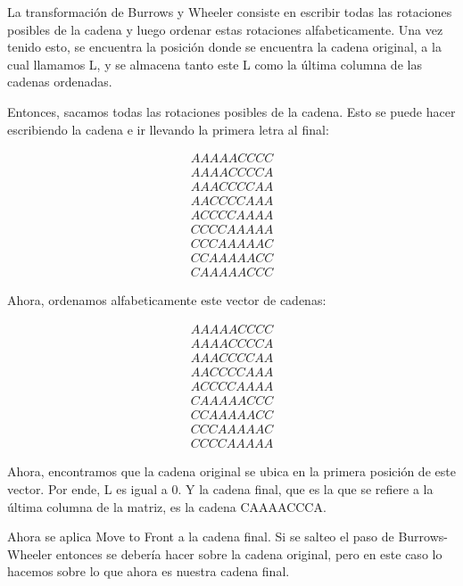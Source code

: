 \documentclass[a4paper]{article}
\begin{document}
    La transformación de Burrows y Wheeler consiste en escribir todas las rotaciones posibles de la cadena y luego ordenar estas rotaciones alfabeticamente. Una vez tenido esto, se encuentra la posición donde se encuentra la cadena original, a la cual llamamos L, y se almacena tanto este L como la última columna de las cadenas ordenadas. 

    Entonces, sacamos todas las rotaciones posibles de la cadena. Esto se puede hacer escribiendo la cadena e ir llevando la primera letra al final:

    \[ 
        \begin{matrix}
            AAAAACCCC \\
            AAAACCCCA \\
            AAACCCCAA \\
            AACCCCAAA \\
            ACCCCAAAA \\
            CCCCAAAAA \\
            CCCAAAAAC \\
            CCAAAAACC \\
            CAAAAACCC 
        \end{matrix}
    \]

    Ahora, ordenamos alfabeticamente este vector de cadenas:

    \[ 
        \begin{matrix}
            AAAAACCCC \\
            AAAACCCCA \\
            AAACCCCAA \\
            AACCCCAAA \\
            ACCCCAAAA \\
            CAAAAACCC \\ 
            CCAAAAACC \\
            CCCAAAAAC \\
            CCCCAAAAA
        \end{matrix}
    \]

    Ahora, encontramos que la cadena original se ubica en la primera posición de este vector. Por ende, L es igual a 0. Y la cadena final, que es la que se refiere a la última columna de la matriz, es la cadena CAAAACCCA.

    Ahora se aplica Move to Front a la cadena final. Si se salteo el paso de Burrows-Wheeler entonces se debería hacer sobre la cadena original, pero en este caso lo hacemos sobre lo que ahora es nuestra cadena final.
\end{document}
